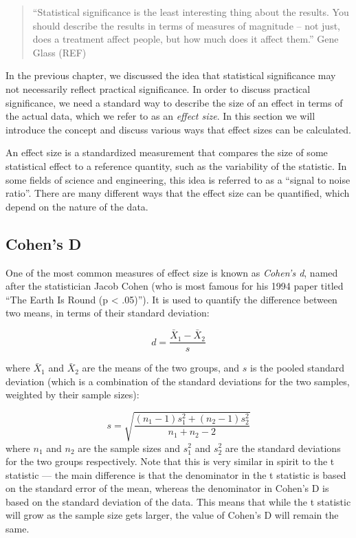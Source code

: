 \documentclass[12pt,]{book}
\theoremstyle{definition}
\theoremstyle{definition}
\theoremstyle{definition}
\theoremstyle{remark}
\begin{document}
\begin{quote}
``Statistical significance is the least interesting thing about the results. You should describe the results in terms of measures of magnitude -- not just, does a treatment affect people, but how much does it affect them.'' Gene Glass (REF)
\end{quote}

In the previous chapter, we discussed the idea that statistical significance may not necessarily reflect practical significance. In order to discuss practical significance, we need a standard way to describe the size of an effect in terms of the actual data, which we refer to as an \emph{effect size}. In this section we will introduce the concept and discuss various ways that effect sizes can be calculated.

An effect size is a standardized measurement that compares the size of some statistical effect to a reference quantity, such as the variability of the statistic. In some fields of science and engineering, this idea is referred to as a ``signal to noise ratio''. There are many different ways that the effect size can be quantified, which depend on the nature of the data.

\hypertarget{cohens-d}{%
\subsection{Cohen's D}\label{cohens-d}}

One of the most common measures of effect size is known as \emph{Cohen's d}, named after the statistician Jacob Cohen (who is most famous for his 1994 paper titled ``The Earth Is Round (p \textless{} .05)''). It is used to quantify the difference between two means, in terms of their standard deviation:

\[
d = \frac{\bar{X}_1 - \bar{X}_2}{s}
\]

where \(\bar{X}_1\) and \(\bar{X}_2\) are the means of the two groups, and \(s\) is the pooled standard deviation (which is a combination of the standard deviations for the two samples, weighted by their sample sizes):

\[
s = \sqrt{\frac{(n_1 - 1)s^2_1 + (n_2 - 1)s^2_2 }{n_1 +n_2 -2}}
\]
where \(n_1\) and \(n_2\) are the sample sizes and \(s^2_1\) and \(s^2_2\) are the standard deviations for the two groups respectively. Note that this is very similar in spirit to the t statistic --- the main difference is that the denominator in the t statistic is based on the standard error of the mean, whereas the denominator in Cohen's D is based on the standard deviation of the data. This means that while the t statistic will grow as the sample size gets larger, the value of Cohen's D will remain the same.
\end{document}
